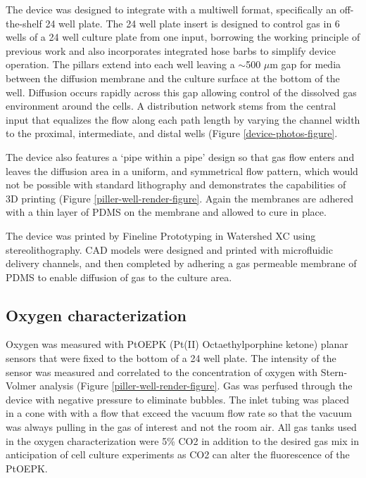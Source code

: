 The device was designed to integrate with a multiwell format, specifically an off-the-shelf 24 well plate. 
The 24 well plate insert is designed to control gas in 6 wells of a 24 well culture plate from one input, borrowing the working principle of previous work\cite{oppegard2010} and also incorporates integrated hose barbs to simplify device operation.
The pillars extend into each well leaving a $\sim$500 $\mu$m gap for media between the diffusion membrane and the culture surface at the bottom of the well.
Diffusion occurs rapidly across this gap allowing control of the dissolved gas environment around the cells. 
A distribution network stems from the central input that equalizes the flow along each path length by varying the channel width to the proximal, intermediate, and distal wells (Figure \ref{device-photos-figure}.

The device also features a ‘pipe within a pipe’ design so that gas flow enters and leaves the diffusion area in a uniform, and symmetrical flow pattern, which would not be possible with standard lithography and demonstrates the capabilities of 3D printing (Figure \ref{piller-well-render-figure}.
Again the membranes are adhered with a thin layer of PDMS on the membrane and allowed to cure in place.

The device was printed by Fineline Prototyping in Watershed XC using stereolithography.
CAD models were designed and printed with microfluidic delivery channels, and then completed by 
adhering a gas permeable membrane of PDMS to enable diffusion of gas to the culture area. 

\subsection*{Oxygen characterization}

Oxygen was measured with PtOEPK (Pt(II) Octaethylporphine ketone) planar sensors that were fixed to the bottom of a 24 well plate. 
The intensity of the sensor was measured and correlated to the concentration of oxygen with Stern-Volmer analysis (Figure \ref{piller-well-render-figure}.
Gas was perfused through the device with negative pressure to eliminate bubbles.
The inlet tubing was placed in a cone with with a flow that exceed the vacuum flow rate so that the vacuum was always pulling in the gas of interest and not the room air.
All gas tanks used in the oxygen characterization were 5\% CO2 in addition to the desired gas mix in anticipation of cell culture experiments as CO2 can alter the fluorescence of the PtOEPK.

